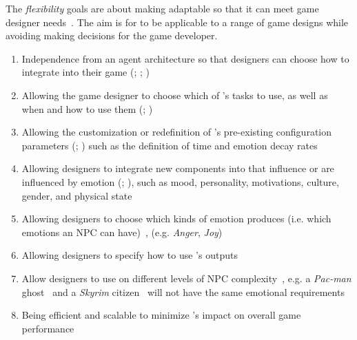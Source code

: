 The \textit{flexibility} goals are about making \progname{} adaptable so that
it can meet game designer needs~\citep[p.~30]{reilly1996believable}. The aim is
for \progname{} to be applicable to a range of game designs while avoiding
making decisions for the game developer.
\begin{enumerate}[label=RF\arabic*]
    \item\label{flexArch} Independence from an agent architecture so that
    designers can choose how to integrate \progname{} into their game
    (;
    ;
    )

    \item\label{flexTasks} Allowing the game designer to choose which of
    \progname{}'s tasks to use, as well as when and how to use
    them (;
    )

    \item\label{flexCustom} Allowing the customization or redefinition of
    \progname{}'s pre-existing configuration parameters
    (; )
    such as the definition of time and emotion decay rates

    \item\label{flexNew} Allowing designers to integrate new components
    into \progname{} that influence or are influenced by emotion
    (;
    ), such as mood, personality,
    motivations, culture, gender, and physical state

    \item\label{flexEm} Allowing designers to choose which kinds of emotion
    \progname{} produces (i.e. which emotions an NPC can
    have)~\citep[p.~331]{hudlicka2014computational}, (e.g. \textit{Anger},
    \textit{Joy})

    \item\label{flexOut} Allowing designers to specify how to use
    \progname{}'s outputs~\citep[p.~86]{loyall1997believable}

    \item\label{flexComplex} Allow designers to use \progname{} on
    different levels of NPC
    complexity~\citep[p.~220]{broekens2016emotional}, e.g. a
    \textit{Pac-man} ghost~\citep{pacman} and a \textit{Skyrim}
    citizen~\citep{skyrim} will not have the same emotional requirements

    \item\label{flexScale} Being efficient and scalable to minimize
    \progname{}'s impact on overall game performance
    \citep[p.~42]{popescu2014gamygdala}
\end{enumerate}

